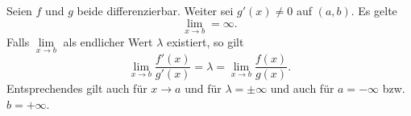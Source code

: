 Seien $f$ und $g$ beide differenzierbar. Weiter sei $g'(x) \neq 0$ auf $(a, b)$. Es gelte 
$$\lim_{x \to b} = \infty.$$
Falls $\lim\limits_{x \to b}$ als endlicher Wert $\lambda$ existiert, so gilt
$$\lim_{x \to b} \frac{f'(x)}{g'(x)} = \lambda = \lim_{x \to b} \frac{f(x)}{g(x)}.$$
Entsprechendes gilt auch für $x \to a$ und für $\lambda = \pm\infty$ und auch für $a=-\infty$ bzw. $b=+\infty$.